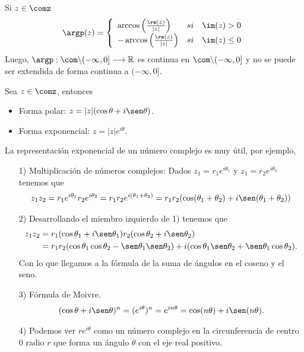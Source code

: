 \begin{obs}
Si $z \in \comz$
\begin{align*}
    \argp(z) = \left\{ \begin{array}{lcc}
            \arccos\left( \frac{\re(z)}{|z|}\right) & si & \im(z) > 0 \\
            -\arccos\left( \frac{\re(z)}{|z|}\right) & si & \im(z) \leq 0\\
             \end{array}
        \right.
\end{align*}
Luego, $\argp : \com \backslash (-\infty,0] \longrightarrow \mathbb{R}$ es continua en $\com \backslash (-\infty,0]$ y no se puede ser extendida de forma continua a $(-\infty,0]$.
\end{obs}

\begin{defi}
Sea $z \in \comz$, entonces
\begin{itemize}
    \item Forma polar: $z = |z|(\cos\theta + i\sen\theta)$.
    \item Forma exponencial: $z = |z|e^{i\theta}$.
\end{itemize}
\end{defi}
La representación exponencial de un número complejo es muy útil, por ejemplo,
\begin{enumerate}
    \item[1)] Multiplicación de números complejos: Dados $z_1 = r_1e^{i\theta_1}$ y $z_1 = r_2e^{i\theta_2}$ tenemos que
    \begin{align*}
        z_1z_2 = r_1e^{i\theta_1}r_2e^{i\theta_2} = r_1r_2e^{i(\theta_1 + \theta_2)} = r_1r_2(\cos(\theta_1 + \theta_2) + i\sen(\theta_1 + \theta_2)) 
    \end{align*}
    \item[2)] Desarrollando el miembro izquierdo de 1) tenemos que
    \begin{align*}
        z_1z_2 &= r_1(\cos\theta_1 + i\sen\theta_1)r_2(\cos\theta_2 + i\sen\theta_2) \\
        &= r_1r_2(\cos\theta_1\cos\theta_2 - \sen\theta_1\sen\theta_2) + i(\cos\theta_1\sen\theta_2 + \sen\theta_1\cos\theta_2).
    \end{align*}
    Con lo que llegamos a la fórmula de la suma de ángulos en el coseno y el seno.
    \item[3)] Fórmula de Moivre.
    \begin{align*}
        (\cos\theta + i\sen\theta)^n = (e^{i\theta})^n = e^{in\theta} = \cos(n\theta) +i\sen(n\theta).
    \end{align*}
    \item[4)] Podemos ver $re^{i\theta}$ como un número complejo en la circunferencia de centro 0 radio $r$ que forma un ángulo $\theta$ con el eje real positivo.
\end{enumerate}

